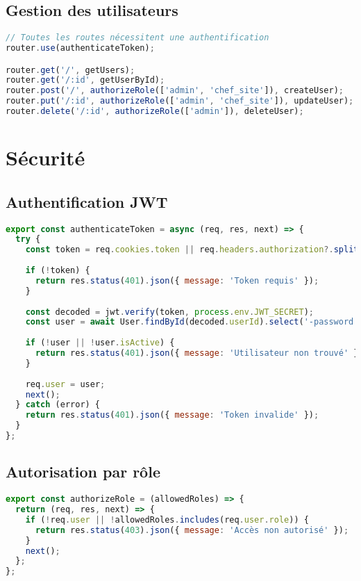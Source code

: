 \subsection{Gestion des utilisateurs}
\begin{lstlisting}[language=JavaScript, caption=Routes utilisateurs]
// Toutes les routes nécessitent une authentification
router.use(authenticateToken);

router.get('/', getUsers);
router.get('/:id', getUserById);
router.post('/', authorizeRole(['admin', 'chef_site']), createUser);
router.put('/:id', authorizeRole(['admin', 'chef_site']), updateUser);
router.delete('/:id', authorizeRole(['admin']), deleteUser);
\end{lstlisting}

\section{Sécurité}
\subsection{Authentification JWT}
\begin{lstlisting}[language=JavaScript, caption=Middleware d'authentification simplifié]
export const authenticateToken = async (req, res, next) => {
  try {
    const token = req.cookies.token || req.headers.authorization?.split(' ')[1];
    
    if (!token) {
      return res.status(401).json({ message: 'Token requis' });
    }
    
    const decoded = jwt.verify(token, process.env.JWT_SECRET);
    const user = await User.findById(decoded.userId).select('-password');
    
    if (!user || !user.isActive) {
      return res.status(401).json({ message: 'Utilisateur non trouvé' });
    }
    
    req.user = user;
    next();
  } catch (error) {
    return res.status(401).json({ message: 'Token invalide' });
  }
};
\end{lstlisting}

\subsection{Autorisation par rôle}
\begin{lstlisting}[language=JavaScript, caption=Middleware d'autorisation simplifié]
export const authorizeRole = (allowedRoles) => {
  return (req, res, next) => {
    if (!req.user || !allowedRoles.includes(req.user.role)) {
      return res.status(403).json({ message: 'Accès non autorisé' });
    }
    next();
  };
};
\end{lstlisting}

